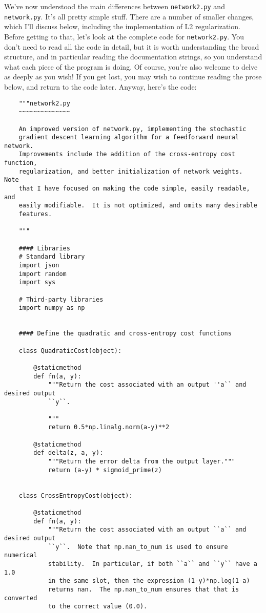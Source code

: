 We've now understood the main differences between \lstinline{network2.py} and \lstinline{network.py}. It's all pretty simple stuff. There are a number of smaller changes, which I'll discuss below, including the implementation of L2 regularization. Before getting to that, let's look at the complete code for \lstinline{network2.py}. You don't need to read all the code in detail, but it is worth understanding the broad structure, and in particular reading the documentation strings, so you understand what each piece of the program is doing. Of course, you're also welcome to delve as deeply as you wish! If you get lost, you may wish to continue reading the prose below, and return to the code later. Anyway, here's the code:



\begin{lstlisting}
    """network2.py
    ~~~~~~~~~~~~~~
    
    An improved version of network.py, implementing the stochastic
    gradient descent learning algorithm for a feedforward neural network.
    Improvements include the addition of the cross-entropy cost function,
    regularization, and better initialization of network weights.  Note
    that I have focused on making the code simple, easily readable, and
    easily modifiable.  It is not optimized, and omits many desirable
    features.
    
    """
    
    #### Libraries
    # Standard library
    import json
    import random
    import sys
    
    # Third-party libraries
    import numpy as np
    
    
    #### Define the quadratic and cross-entropy cost functions
    
    class QuadraticCost(object):
    
        @staticmethod
        def fn(a, y):
            """Return the cost associated with an output ''a`` and desired output
            ``y``.
    
            """
            return 0.5*np.linalg.norm(a-y)**2
    
        @staticmethod
        def delta(z, a, y):
            """Return the error delta from the output layer."""
            return (a-y) * sigmoid_prime(z)
    
    
    class CrossEntropyCost(object):
    
        @staticmethod
        def fn(a, y):
            """Return the cost associated with an output ``a`` and desired output
            ``y``.  Note that np.nan_to_num is used to ensure numerical
            stability.  In particular, if both ``a`` and ``y`` have a 1.0
            in the same slot, then the expression (1-y)*np.log(1-a)
            returns nan.  The np.nan_to_num ensures that that is converted
            to the correct value (0.0).
    

\end{lstlisting}
